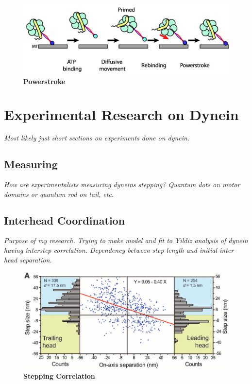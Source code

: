 \begin{figure}[H]
	\centering
	\includegraphics[width=1\columnwidth]{Figures/powerstroke.jpeg}
	\caption[Powerstroke]{\textbf{Powerstroke}  \cite{Carter2010communication} }
	\label{fig:Powerstroke}
\end{figure}


\section{Experimental Research on Dynein}
\textit{Most likely just short sections on experiments done on dynein.}
\subsection{Measuring}
\textit{How are experimentalists measuring dyneins stepping? Quantum dots on motor domains or quantum rod on tail, etc. }

\subsection{Interhead Coordination}
\textit{Purpose of my research. Trying to make model and fit to Yildiz analysis of dynein having interstep correlation. Dependency between step length and initial inter head separation.}

\begin{figure}[H]
	\centering
	\includegraphics[width=1\columnwidth]{Figures/Yildiz_stepping.png}
	\caption[Stepping Correlation]{\textbf{Stepping Correlation}  \cite{Dewitt2012} }
	\label{fig:YildizCorrelation}
\end{figure}
